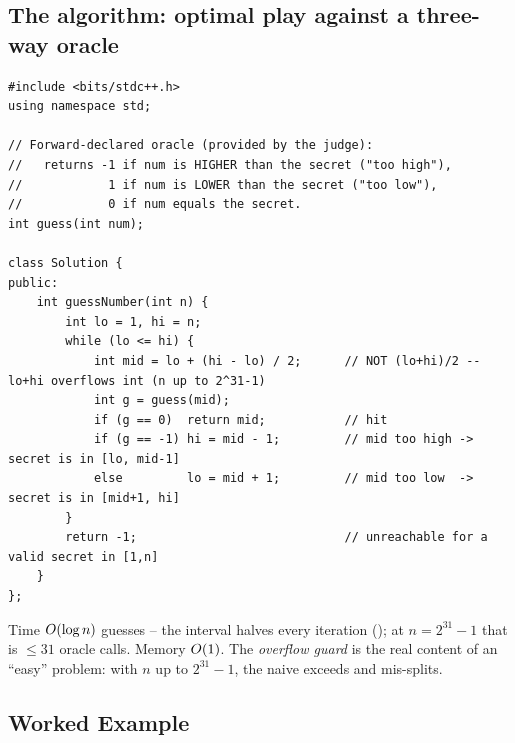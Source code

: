 \subsection{The algorithm: optimal play against a three-way oracle}

\begin{lstlisting}[caption={Guess Number Higher or Lower -- overflow-safe binary search on a comparison oracle}, label={lst:c25-guess}]
#include <bits/stdc++.h>
using namespace std;

// Forward-declared oracle (provided by the judge):
//   returns -1 if num is HIGHER than the secret ("too high"),
//            1 if num is LOWER than the secret ("too low"),
//            0 if num equals the secret.
int guess(int num);

class Solution {
public:
    int guessNumber(int n) {
        int lo = 1, hi = n;
        while (lo <= hi) {
            int mid = lo + (hi - lo) / 2;      // NOT (lo+hi)/2 -- lo+hi overflows int (n up to 2^31-1)
            int g = guess(mid);
            if (g == 0)  return mid;           // hit
            if (g == -1) hi = mid - 1;         // mid too high -> secret is in [lo, mid-1]
            else         lo = mid + 1;         // mid too low  -> secret is in [mid+1, hi]
        }
        return -1;                             // unreachable for a valid secret in [1,n]
    }
};
\end{lstlisting}
\begin{complexitybox}
Time $O(\log n)$ guesses -- the interval halves every iteration (); at
$n=2^{31}{-}1$ that is $\le 31$ oracle calls. Memory $O(1)$. The \emph{overflow guard}
 is the real content of an ``easy'' problem: with $n$ up to $2^{31}{-}1$, the
naive  exceeds  and mis-splits.
\end{complexitybox}

\subsection{Worked Example}

